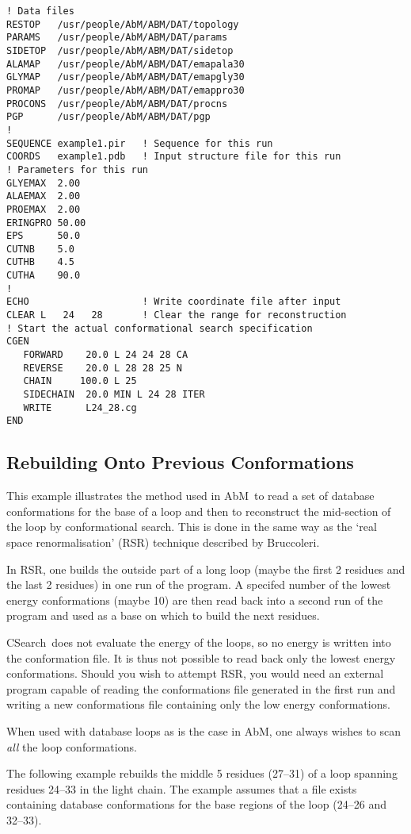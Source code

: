 \documentclass{report}
\newcommand{\cs}{CSearch}
\newcommand{\abm}{AbM}
\begin{document}
\begin{verbatim}
! Data files
RESTOP   /usr/people/AbM/ABM/DAT/topology
PARAMS   /usr/people/AbM/ABM/DAT/params
SIDETOP  /usr/people/AbM/ABM/DAT/sidetop
ALAMAP   /usr/people/AbM/ABM/DAT/emapala30
GLYMAP   /usr/people/AbM/ABM/DAT/emapgly30
PROMAP   /usr/people/AbM/ABM/DAT/emappro30
PROCONS  /usr/people/AbM/ABM/DAT/procns
PGP      /usr/people/AbM/ABM/DAT/pgp
!
SEQUENCE example1.pir   ! Sequence for this run
COORDS   example1.pdb   ! Input structure file for this run
! Parameters for this run
GLYEMAX  2.00
ALAEMAX  2.00
PROEMAX  2.00
ERINGPRO 50.00
EPS      50.0
CUTNB    5.0
CUTHB    4.5
CUTHA    90.0
!
ECHO                    ! Write coordinate file after input
CLEAR L   24   28       ! Clear the range for reconstruction
! Start the actual conformational search specification
CGEN
   FORWARD    20.0 L 24 24 28 CA
   REVERSE    20.0 L 28 28 25 N
   CHAIN     100.0 L 25
   SIDECHAIN  20.0 MIN L 24 28 ITER
   WRITE      L24_28.cg
END
\end{verbatim}

\subsection{Rebuilding Onto Previous Conformations}
This example illustrates the method used in \abm\ to read a set of
database conformations for the base of a loop and then to reconstruct
the mid-section of the loop by conformational search. This is done
in the same way as the `real space renormalisation' (RSR) 
technique described by Bruccoleri\cite{bruc:congen,bruc:hy5}.

In RSR, one builds the outside part of a long loop (maybe the first 2
residues and the last 2 residues) in one run of the program. A specifed 
number of the lowest energy conformations (maybe 10) are then read back
into a second run of the program and used as a base on which to build 
the next residues.

\cs\ does not evaluate the energy of the loops, so no energy is written
into the conformation file. It is thus not possible to read back only
the lowest energy conformations. Should you wish to attempt RSR, you
would need an external program capable of reading the conformations
file generated in the first run and writing a new conformations file
containing only the low energy conformations.

When used with database loops as is the case in \abm, one always wishes
to scan {\em all\/} the loop conformations.

The following example rebuilds the middle 5 residues (27--31) of
a loop spanning residues 24--33 in the light chain. The example assumes
that a file exists containing database conformations for the base 
regions of the loop (24--26 and 32--33).
\end{document}
